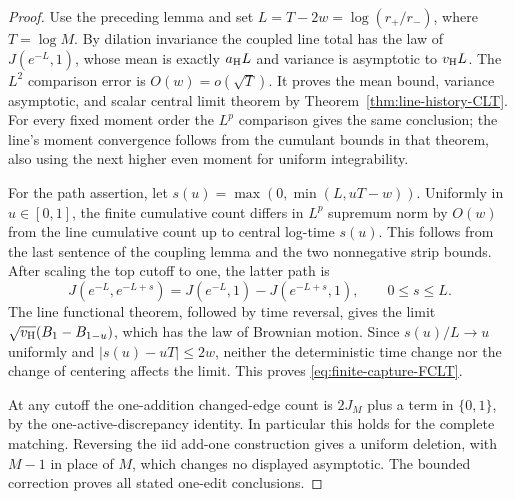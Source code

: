 \documentclass[11pt,letterpaper]{article}
\begin{document}
\begin{proof}
Use the preceding lemma and set
$L=T-2w=\log(r_+/r_-)$, where $T=\log M$.
By dilation invariance the coupled line total has the law of
$J(e^{-L},1)$, whose mean is exactly $a_{\rm H}L$ and variance
is asymptotic to $v_{\rm H}L$. The $L^2$ comparison error is
$O(w)=o(\sqrt T)$. It proves the mean bound, variance asymptotic,
and scalar central limit theorem by Theorem~\ref{thm:line-history-CLT}.
For every fixed moment order the $L^p$ comparison gives the same
conclusion; the line's moment convergence follows from the
cumulant bounds in that theorem, also using the next higher even
moment for uniform integrability.

For the path assertion, let
$s(u)=\max(0,\min(L,uT-w))$. Uniformly in $u\in[0,1]$, the finite
cumulative count differs in $L^p$ supremum norm by $O(w)$ from
the line cumulative count up to central log-time $s(u)$.
This follows from the last sentence of the coupling lemma and
the two nonnegative strip bounds. After scaling the top cutoff
to one, the latter path is
\[
 J(e^{-L},e^{-L+s})=J(e^{-L},1)-J(e^{-L+s},1),\qquad 0\le s\le L.
\]
The line functional theorem, followed by time reversal, gives
the limit $\sqrt{v_{\rm H}}(B_1-B_{1-u})$, which has the law of
Brownian motion. Since $s(u)/L\to u$ uniformly and
$|s(u)-uT|\le2w$, neither the deterministic time change nor
the change of centering affects the limit. This proves
\eqref{eq:finite-capture-FCLT}.

At any cutoff the one-addition changed-edge count is $2J_M$
plus a term in $\{0,1\}$, by the one-active-discrepancy identity.
In particular this holds for the complete matching. Reversing
the iid add-one construction gives a uniform deletion, with
$M-1$ in place of $M$, which changes no displayed asymptotic.
The bounded correction proves all stated one-edit conclusions.
\end{proof}
\end{document}
